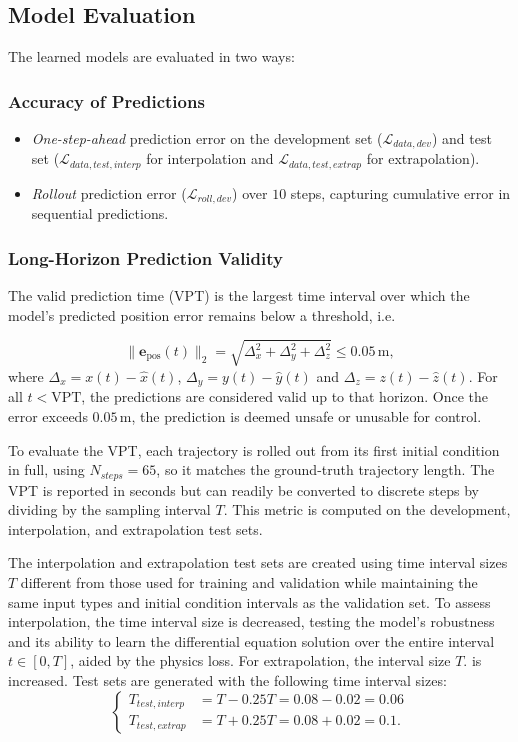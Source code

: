 \documentclass[conference]{IEEEtran}
\begin{document}
{\subsection{Model Evaluation}
\label{sec:model_eval}
The learned models are evaluated in two ways:
\subsubsection{Accuracy of Predictions}
\begin{itemize}
    \item \textit{One-step-ahead} prediction error on the development set ($\mathcal{L}_{data,dev}$) and test set ($\mathcal{L}_{data,test,interp}$ for interpolation and $\mathcal{L}_{data,test,extrap}$ for extrapolation).
    \item \textit{Rollout} prediction error ($\mathcal{L}_{roll,dev}$) over $10$ steps, capturing cumulative error in sequential predictions.
\end{itemize}
\subsubsection{Long-Horizon Prediction Validity}
The valid prediction time (VPT) is the largest time interval over which the model’s predicted position error remains below a threshold, i.e.

\begin{equation}
\|\mathbf{e}_{\text{pos}}(t)\|_2 = \sqrt{\Delta_x^2 + \Delta_y^2 + \Delta_z^2} \leq 0.05\,\mathrm{m}, 
\end{equation}
where $\Delta_x = x(t) - \hat{x}(t)$, $\Delta_y = y(t) - \hat{y}(t)$ and $\Delta_z = z(t) - \hat{z}(t)$. For all $t < \text{VPT}$, the predictions are considered valid up to that horizon. Once the error exceeds $0.05\,\mathrm{m}$, the prediction is deemed unsafe or unusable for control.

To evaluate the VPT, each trajectory is rolled out from its first initial condition in full, using 
$N_{steps} = 65$, so it matches the ground-truth trajectory length. The VPT is reported in seconds but can readily be converted to discrete steps by dividing by the sampling interval $T$. This metric is computed on the development, interpolation, and extrapolation test sets.

The interpolation and extrapolation test sets are created using time interval sizes $T$ different from those used for training and validation while maintaining the same input types and initial condition intervals as the validation set. To assess interpolation, the time interval size is decreased, testing the model's robustness and its ability to learn the differential equation solution over the entire interval $t\in[0,T]$, aided by the physics loss. For extrapolation, the interval size $T$. is increased. Test sets are generated with the following time interval sizes:
\begin{equation}
\begin{cases}
    T_{test,interp} &= T - 0.25T = 0.08 - 0.02 = 0.06 \\
    T_{test,extrap} &= T + 0.25T = 0.08 + 0.02 = 0.1.
\end{cases}
\end{equation}

}
\end{document}
